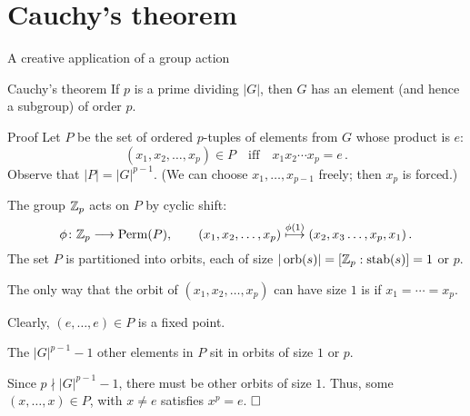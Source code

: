 \documentclass[8pt, handout]{beamer}
\newcommand{\Pause}{}      %
\begin{document}
\section*{Cauchy's theorem}
\begin{frame}{A creative application of a group action}

  \begin{block}{Cauchy's theorem} 
    If $p$ is a prime dividing $|G|$, then $G$ has an element (and
    hence a subgroup) of order $p$.
  \end{block}
  
  \begin{exampleblock}{Proof} \Pause
    Let $P$ be the set of ordered $p$-tuples of
    elements from $G$ whose product is $e$: \vspace{-1mm}
    \[
    (x_1,x_2,\dots,x_p)\in P\quad\mbox{iff}\quad x_1x_2\cdots
    x_p=e\,. \Pause
    \]
    Observe that $|P|=|G|^{p-1}$. (We can choose
    $x_1,\dots,x_{p-1}$ freely; then $x_p$ is forced.)
    
    \pause\medskip 
    
    The group $\mathbb{Z}_p$ acts on $P$ by cyclic shift: \vspace{-2
      mm}
    \[
    \phi\colon\Z_p\longrightarrow\Perm(P),\qquad
    (x_1,x_2,\dots,x_p)\stackrel{\phi(1)}{\longmapsto}
    (x_2,x_3\dots,x_p,x_1)\,. %
    \]
    \Pause The set $P$ is partitioned into orbits, each of size
    $|\operatorname{orb}(s)|=[\mathbb{Z}_p:\operatorname{stab}(s)]=1$ or $p$.
        
    \pause\medskip
    
    The only way that the orbit of $(x_1,x_2,\dots,x_p)$
    can have size $1$ is if $x_1=\cdots=x_p$.

    \Pause\medskip

    Clearly, $(e,\dots,e)\in P$ is a fixed point.
    
    \Pause\medskip
    
    The $|G|^{p-1}-1$ other elements in $P$ sit in orbits of size $1$
    or $p$.
    
    \pause\medskip
    
    Since $p\nmid |G|^{p-1}-1$, there must be other orbits of size
    $1$. \Pause Thus, some $(x,\dots,x)\in P$, with $x\neq e$ satisfies
    $x^p=e$. $\hfill\Box$
  \end{exampleblock}
  
\end{frame}

\end{document}
